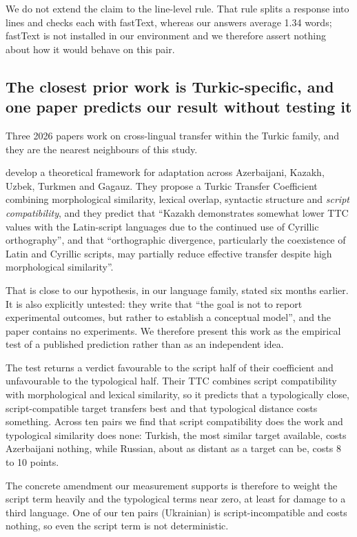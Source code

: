 \documentclass[final]{clv2025}
\begin{document}
We do not extend the claim to the line-level rule. That rule splits a response
into lines and checks each with fastText, whereas our answers average 1.34
words; fastText is not installed in our environment and we therefore assert
nothing about how it would behave on this pair.

\subsection{The closest prior work is Turkic-specific, and one paper predicts
our result without testing it}

Three 2026 papers work on cross-lingual transfer within the Turkic family, and
they are the nearest neighbours of this study.

 develop a theoretical framework for adaptation
across Azerbaijani, Kazakh, Uzbek, Turkmen and Gagauz. They propose a Turkic
Transfer Coefficient combining morphological similarity, lexical overlap,
syntactic structure and \emph{script compatibility}, and they predict that
``Kazakh demonstrates somewhat lower TTC values with the Latin-script languages
due to the continued use of Cyrillic orthography'', and that ``orthographic
divergence, particularly the coexistence of Latin and Cyrillic scripts, may
partially reduce effective transfer despite high morphological similarity''.

That is close to our hypothesis, in our language family, stated six months
earlier. It is also explicitly untested: they write that ``the goal is not to
report experimental outcomes, but rather to establish a conceptual model'', and
the paper contains no experiments. We therefore present this work as the
empirical test of a published prediction rather than as an independent idea.

The test returns a verdict favourable to the script half of their coefficient
and unfavourable to the typological half. Their TTC combines script
compatibility with morphological and lexical similarity, so it predicts that a
typologically close, script-compatible target transfers best and that
typological distance costs something. Across ten pairs we find that script
compatibility does the work and typological similarity does none: Turkish, the
most similar target available, costs Azerbaijani nothing, while Russian, about
as distant as a target can be, costs 8 to 10 points.

The concrete amendment our measurement supports is therefore to weight the
script term heavily and the typological terms near zero, at least for damage to
a third language. One of our ten pairs (Ukrainian) is script-incompatible and
costs nothing, so even the script term is not deterministic.
\end{document}
